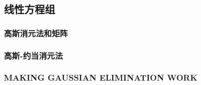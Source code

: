 \subsection{线性方程组}

\subsubsection{高斯消元法和矩阵}

\subsubsection{高斯-约当消元法}

\subsubsection{MAKING GAUSSIAN ELIMINATION WORK}